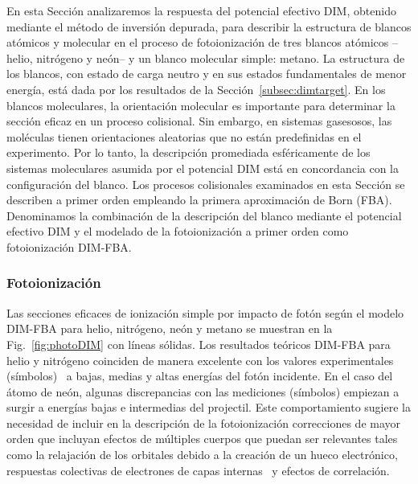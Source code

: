 En esta Sección analizaremos la respuesta del potencial efectivo DIM, 
obtenido mediante el método de inversión depurada, para describir la 
estructura de blancos atómicos y molecular en el proceso de 
fotoionización de tres blancos atómicos --helio, nitrógeno y neón-- y un 
blanco molecular simple: metano. La estructura de los blancos, con 
estado de carga neutro y en sus estados fundamentales de menor energía, 
está dada por los resultados de la Sección~\ref{subsec:dimtarget}. 
En los blancos moleculares, la orientación molecular es importante para 
determinar la sección eficaz en un proceso colisional. Sin embargo, en 
sistemas gasesosos, las moléculas tienen orientaciones aleatorias que no 
están predefinidas en el experimento. Por lo tanto, la descripción 
promediada esféricamente de los sistemas moleculares asumida por el 
potencial DIM está en concordancia con la configuración del blanco.
Los procesos colisionales examinados en esta Sección se describen a 
primer orden empleando la primera aproximación de Born (FBA). 
Denominamos la combinación de la descripción del blanco mediante el 
potencial efectivo DIM y el modelado de la fotoionización a primer orden 
como fotoionización DIM-FBA.  

\subsubsection{Fotoionización}
\label{subsec:foto}

Las secciones eficaces de ionización simple por impacto de fotón según 
el modelo DIM-FBA para helio, nitrógeno, neón y metano se muestran en 
la Fig.~\ref{fig:photoDIM} con líneas 
sólidas. Los resultados teóricos DIM-FBA para helio y nitrógeno 
coinciden de manera excelente con los valores experimentales 
(símbolos)~\cite{Samson:90,Henke:93,Stolte:16} a bajas, medias y altas 
energías del fotón incidente. En el caso del átomo de neón, algunas 
discrepancias con las mediciones (símbolos) \cite{Henke:93,Samson:02} 
empiezan a surgir a energías bajas e intermedias del projectil. Este 
comportamiento sugiere la necesidad de incluir en la descripción de la 
fotoionización correcciones de mayor orden que incluyan efectos de 
múltiples cuerpos que puedan ser relevantes tales como la relajación de 
los orbitales debido a la creación de un hueco electrónico, respuestas 
colectivas de electrones de capas internas~\cite{Ederer:64} y efectos de 
correlación.

